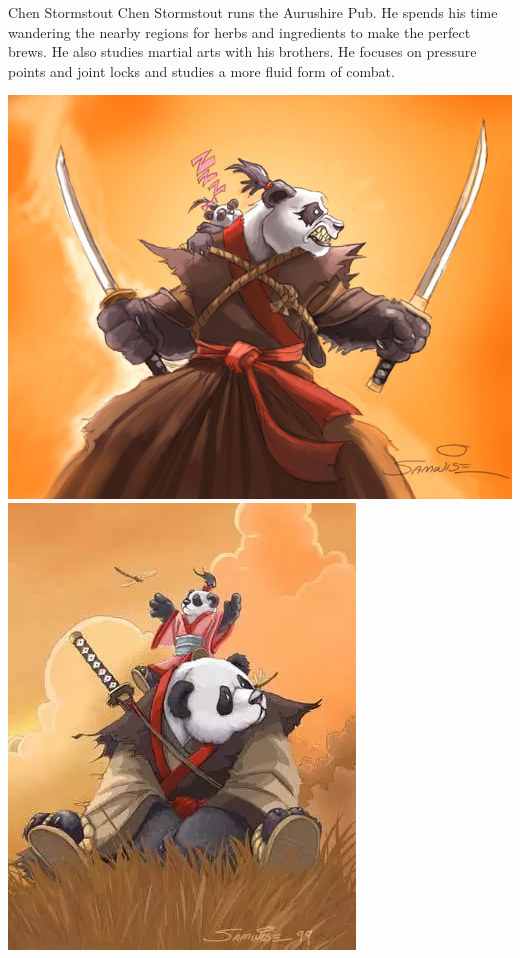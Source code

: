 \begin{monsterbox}{Chen Stormstout}
	Chen Stormstout runs the Aurushire Pub. He spends his time wandering the nearby regions for herbs and ingredients to make the perfect brews. He also studies martial arts with his brothers. He focuses on pressure points and joint locks and studies a more fluid form of combat.
\end{monsterbox}

\begin{center}
	\includegraphics[width=0.60\linewidth]{img/WoW/ekron.jpg} \includegraphics[width=0.375\linewidth]{img/WoW/twopandare.jpg}
\end{center}

